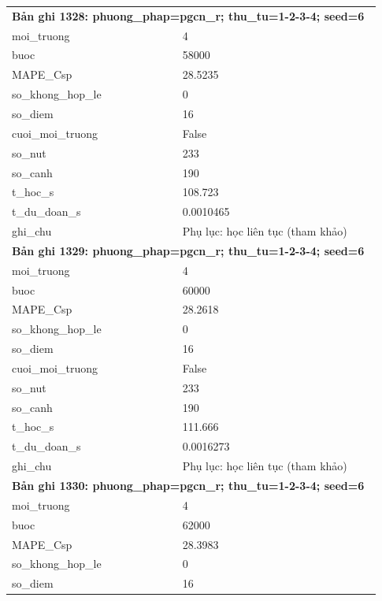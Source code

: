 \begin{longtable}{p{0.43\linewidth}p{0.50\linewidth}}
\midrule
\multicolumn{2}{p{0.95\linewidth}}{\textbf{Bản ghi 1328: phuong\_phap=pgcn\_r; thu\_tu=1-2-3-4; seed=6}} \\
moi\_\allowbreak truong & 4 \\
buoc & 58000 \\
MAPE\_\allowbreak Csp & 28.5235 \\
so\_\allowbreak khong\_\allowbreak hop\_\allowbreak le & 0 \\
so\_\allowbreak diem & 16 \\
cuoi\_\allowbreak moi\_\allowbreak truong & False \\
so\_\allowbreak nut & 233 \\
so\_\allowbreak canh & 190 \\
t\_\allowbreak hoc\_\allowbreak s & 108.723 \\
t\_\allowbreak du\_\allowbreak doan\_\allowbreak s & 0.0010465 \\
ghi\_\allowbreak chu & Phụ lục: học liên tục (tham khảo) \\
\midrule
\multicolumn{2}{p{0.95\linewidth}}{\textbf{Bản ghi 1329: phuong\_phap=pgcn\_r; thu\_tu=1-2-3-4; seed=6}} \\
moi\_\allowbreak truong & 4 \\
buoc & 60000 \\
MAPE\_\allowbreak Csp & 28.2618 \\
so\_\allowbreak khong\_\allowbreak hop\_\allowbreak le & 0 \\
so\_\allowbreak diem & 16 \\
cuoi\_\allowbreak moi\_\allowbreak truong & False \\
so\_\allowbreak nut & 233 \\
so\_\allowbreak canh & 190 \\
t\_\allowbreak hoc\_\allowbreak s & 111.666 \\
t\_\allowbreak du\_\allowbreak doan\_\allowbreak s & 0.0016273 \\
ghi\_\allowbreak chu & Phụ lục: học liên tục (tham khảo) \\
\midrule
\multicolumn{2}{p{0.95\linewidth}}{\textbf{Bản ghi 1330: phuong\_phap=pgcn\_r; thu\_tu=1-2-3-4; seed=6}} \\
moi\_\allowbreak truong & 4 \\
buoc & 62000 \\
MAPE\_\allowbreak Csp & 28.3983 \\
so\_\allowbreak khong\_\allowbreak hop\_\allowbreak le & 0 \\
so\_\allowbreak diem & 16 \\

\end{longtable}
